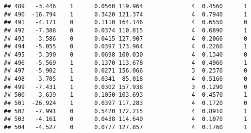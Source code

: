 \documentclass[
]{article}
\begin{document}
\begin{verbatim}
## 489   -3.446    1      0.0560 119.964              4  0.4560      1
## 490  -16.794    1      0.3420 121.374              4  0.7940      1
## 491   -4.171    0      0.1110 164.146              4  0.6550      0
## 492   -7.388    0      0.0374 110.815              4  0.6890      1
## 493   -3.586    0      0.0415 127.907              4  0.2060      0
## 494   -5.055    0      0.0397 173.964              4  0.2260      1
## 495   -3.390    0      0.0698 100.030              4  0.1340      0
## 496   -5.569    1      0.1370 113.678              4  0.4960      1
## 497   -5.902    1      0.0271 156.066              3  0.2370      0
## 498   -3.705    1      0.0341  85.018              4  0.5160      0
## 499   -7.431    1      0.0302 157.938              3  0.1290      0
## 500   -3.639    1      0.1050 103.693              4  0.4570      1
## 501  -26.924    1      0.0397 117.283              4  0.1720      0
## 502   -7.991    0      0.5420 172.215              4  0.8910      1
## 503   -4.161    0      0.0438 114.640              4  0.1070      1
## 504   -4.527    0      0.0777 127.857              4  0.1760      1
\end{verbatim}
\end{document}
